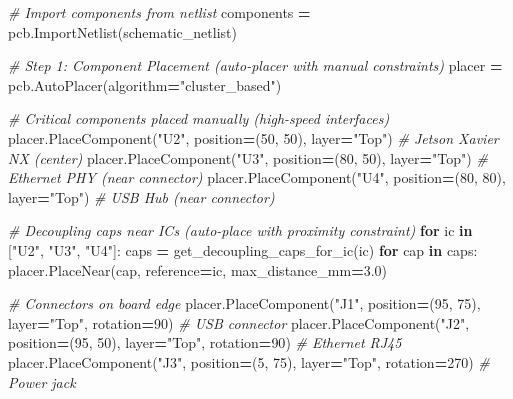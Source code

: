 \documentclass[
]{article}
\newenvironment{Shaded}{\begin{snugshade}}{\end{snugshade}}
\newcommand{\CommentTok}[1]{\textcolor[rgb]{0.56,0.35,0.01}{\textit{#1}}}
\newcommand{\ControlFlowTok}[1]{\textcolor[rgb]{0.13,0.29,0.53}{\textbf{#1}}}
\newcommand{\DecValTok}[1]{\textcolor[rgb]{0.00,0.00,0.81}{#1}}
\newcommand{\FloatTok}[1]{\textcolor[rgb]{0.00,0.00,0.81}{#1}}
\newcommand{\KeywordTok}[1]{\textcolor[rgb]{0.13,0.29,0.53}{\textbf{#1}}}
\newcommand{\NormalTok}[1]{#1}
\newcommand{\OperatorTok}[1]{\textcolor[rgb]{0.81,0.36,0.00}{\textbf{#1}}}
\newcommand{\StringTok}[1]{\textcolor[rgb]{0.31,0.60,0.02}{#1}}
\begin{document}
\begin{Shaded}
\begin{Highlighting}[]
    \CommentTok{\# Import components from netlist}
\NormalTok{    components }\OperatorTok{=}\NormalTok{ pcb.ImportNetlist(schematic\_netlist)}

    \CommentTok{\# Step 1: Component Placement (auto{-}placer with manual constraints)}
\NormalTok{    placer }\OperatorTok{=}\NormalTok{ pcb.AutoPlacer(algorithm}\OperatorTok{=}\StringTok{"cluster\_based"}\NormalTok{)}

    \CommentTok{\# Critical components placed manually (high{-}speed interfaces)}
\NormalTok{    placer.PlaceComponent(}\StringTok{"U2"}\NormalTok{, position}\OperatorTok{=}\NormalTok{(}\DecValTok{50}\NormalTok{, }\DecValTok{50}\NormalTok{), layer}\OperatorTok{=}\StringTok{"Top"}\NormalTok{)  }\CommentTok{\# Jetson Xavier NX (center)}
\NormalTok{    placer.PlaceComponent(}\StringTok{"U3"}\NormalTok{, position}\OperatorTok{=}\NormalTok{(}\DecValTok{80}\NormalTok{, }\DecValTok{50}\NormalTok{), layer}\OperatorTok{=}\StringTok{"Top"}\NormalTok{)  }\CommentTok{\# Ethernet PHY (near connector)}
\NormalTok{    placer.PlaceComponent(}\StringTok{"U4"}\NormalTok{, position}\OperatorTok{=}\NormalTok{(}\DecValTok{80}\NormalTok{, }\DecValTok{80}\NormalTok{), layer}\OperatorTok{=}\StringTok{"Top"}\NormalTok{)  }\CommentTok{\# USB Hub (near connector)}

    \CommentTok{\# Decoupling caps near ICs (auto{-}place with proximity constraint)}
    \ControlFlowTok{for}\NormalTok{ ic }\KeywordTok{in}\NormalTok{ [}\StringTok{"U2"}\NormalTok{, }\StringTok{"U3"}\NormalTok{, }\StringTok{"U4"}\NormalTok{]:}
\NormalTok{        caps }\OperatorTok{=}\NormalTok{ get\_decoupling\_caps\_for\_ic(ic)}
        \ControlFlowTok{for}\NormalTok{ cap }\KeywordTok{in}\NormalTok{ caps:}
\NormalTok{            placer.PlaceNear(cap, reference}\OperatorTok{=}\NormalTok{ic, max\_distance\_mm}\OperatorTok{=}\FloatTok{3.0}\NormalTok{)}

    \CommentTok{\# Connectors on board edge}
\NormalTok{    placer.PlaceComponent(}\StringTok{"J1"}\NormalTok{, position}\OperatorTok{=}\NormalTok{(}\DecValTok{95}\NormalTok{, }\DecValTok{75}\NormalTok{), layer}\OperatorTok{=}\StringTok{"Top"}\NormalTok{, rotation}\OperatorTok{=}\DecValTok{90}\NormalTok{)  }\CommentTok{\# USB connector}
\NormalTok{    placer.PlaceComponent(}\StringTok{"J2"}\NormalTok{, position}\OperatorTok{=}\NormalTok{(}\DecValTok{95}\NormalTok{, }\DecValTok{50}\NormalTok{), layer}\OperatorTok{=}\StringTok{"Top"}\NormalTok{, rotation}\OperatorTok{=}\DecValTok{90}\NormalTok{)  }\CommentTok{\# Ethernet RJ45}
\NormalTok{    placer.PlaceComponent(}\StringTok{"J3"}\NormalTok{, position}\OperatorTok{=}\NormalTok{(}\DecValTok{5}\NormalTok{, }\DecValTok{75}\NormalTok{), layer}\OperatorTok{=}\StringTok{"Top"}\NormalTok{, rotation}\OperatorTok{=}\DecValTok{270}\NormalTok{)  }\CommentTok{\# Power jack}


\end{Highlighting}
\end{Shaded}
\end{document}
